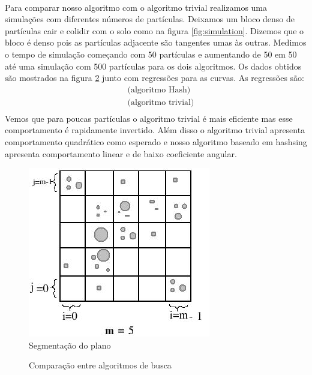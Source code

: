 \documentclass[a4paper,11pt]{article}
\begin{document}
\paragraph{}Para comparar nosso algoritmo com o algoritmo trivial realizamos uma
simulações com diferentes números de partículas. Deixamos um bloco denso de
partículas cair e colidir com o solo como na figura \ref{fig:simulation}.
Dizemos que o bloco é denso pois as partículas adjacente são tangentes umas 
às outras. Medimos o tempo de simulação começando com 50 partículas e aumentando
de 50 em 50 até uma simulação com 500 partículas para os dois algoritmos. Os 
dados obtidos são mostrados na figura \ref{fig:hash-time-comparsion} junto com
regressões para as curvas. As regressões são:
\begin{displaymath}
  \begin{array}{ll}
   & \mbox{ (algoritmo Hash)} \\
   & \mbox{ (algoritmo trivial)} \\
  \end{array}
\end{displaymath}
Vemos que para poucas partículas o algoritmo trivial é mais eficiente mas esse
comportamento é rapidamente invertido. Além disso o algoritmo trivial apresenta
comportamento quadrático como esperado e nosso algoritmo baseado em hashsing
apresenta comportamento linear e de baixo coeficiente angular.


 \begin{figure}[!htp]
	\centering
	\includegraphics[scale=0.8]{./images/hash.jpeg}
	\caption{Segmentação do plano}
	\label{fig:hash}
\end{figure}
\vspace{-5 cm}
\begin{figure}
	\centering
	
	\caption{Comparação entre algoritmos de busca}
	\label{fig:hash-time-comparsion}
\end{figure}
\FloatBarrier
\end{document}
